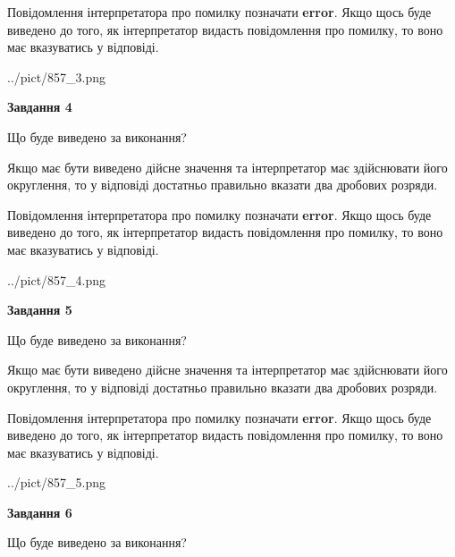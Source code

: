 \documentclass[12pt, ukrainian]{article}
\begin{document}
{\begin {Large}
Повідомлення інтерпретатора про помилку позначати \textbf{error}.
Якщо щось буде виведено до того, як інтерпретатор видасть повідомлення про помилку, 
то воно має вказуватись у відповіді. \par

\begin{center}
	{../pict/857_3.png}
\end{center}
\newpage

{\begin {center}\textbf{Завдання 4}\end {center}}\par
Що буде виведено за виконання? \par

Якщо має бути виведено дійсне значення та інтерпретатор має здійснювати його округлення, 
то у відповіді достатньо правильно вказати два дробових розряди.

Повідомлення інтерпретатора про помилку позначати \textbf{error}.
Якщо щось буде виведено до того, як інтерпретатор видасть повідомлення про помилку, 
то воно має вказуватись у відповіді. \par

\begin{center}
	{../pict/857_4.png}
\end{center}
\newpage

{\begin {center}\textbf{Завдання 5}\end {center}}\par
Що буде виведено за виконання? \par

Якщо має бути виведено дійсне значення та інтерпретатор має здійснювати його округлення, 
то у відповіді достатньо правильно вказати два дробових розряди.

Повідомлення інтерпретатора про помилку позначати \textbf{error}.
Якщо щось буде виведено до того, як інтерпретатор видасть повідомлення про помилку, 
то воно має вказуватись у відповіді. \par

\begin{center}
	{../pict/857_5.png}
\end{center}
\newpage

{\begin {center}\textbf{Завдання 6}\end {center}}\par
Що буде виведено за виконання? \par


\end{Large}}
\end{document}

